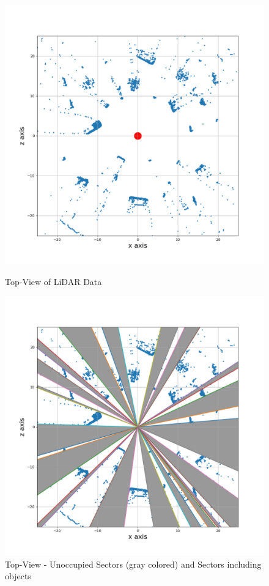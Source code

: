 \begin{figure}
\centering
\begin{minipage}{0.44\textwidth}
  \centering
         \includegraphics[scale=0.445]{./images/sector-transforms/scene-with-centre.pdf}
       \caption{Top-View of LiDAR Data}
       \label{fig:sectors1}
\end{minipage}%
\begin{minipage}{0.44\textwidth}
  \centering
        \includegraphics[scale=0.448]{./images/sector-transforms/scene-with-sector.pdf}
        \caption{Top-View - Unoccupied Sectors (gray colored) and  Sectors including objects}
        \label{fig:sectors2}
\end{minipage}%
\end{figure}









